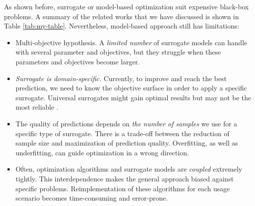         As shown before, surrogate or model-based optimization suit expensive black-box problems. A summary of the related works that we have discussed is shown in Table \ref{tab:my-table}. Nevertheless, model-based approach still has limitations:
        \begin{itemize}
            \item Multi-objective hypothesis. A \emph{limited number} of surrogate models can handle with several parameter and objectives, but they struggle when these parameters and objectives become larger. 
            \item \emph{Surrogate is domain-specific.} Currently, to improve and reach the best prediction, we need to know the objective surface in order to apply a specific surrogate. Universal surrogates might gain optimal results but may not be the most reliable \cite{abs181207958, LuST19}. 
            \item The quality of predictions depends on \emph{the number of samples} we use for a specific type of surrogate. There is a trade-off between the reduction of sample size and maximization of prediction quality. Overfitting, as well as underfitting, can guide optimization in a wrong direction.
            \item Often, optimization algorithms and surrogate models are \emph{coupled} extremely tightly. This interdependence makes the general approach biased against specific problems. Reimplementation of these algorithms for each usage scenario becomes time-consuming and error-prone.
        \end{itemize}

